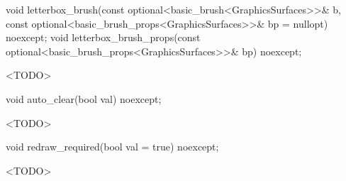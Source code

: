 %
\begin{itemdecl}
void letterbox_brush(const optional<basic_brush<GraphicsSurfaces>>& b,
  const optional<basic_brush_props<GraphicsSurfaces>>& bp = nullopt) noexcept;
void letterbox_brush_props(const optional<basic_brush_props<GraphicsSurfaces>>& bp) noexcept;
\end{itemdecl}
\begin{itemdescr}
\pnum
\effects
<TODO>
\end{itemdescr}

%
\begin{itemdecl}
void auto_clear(bool val) noexcept;
\end{itemdecl}
\begin{itemdescr}
\pnum
\effects
<TODO>
\end{itemdescr}

%
\begin{itemdecl}
void redraw_required(bool val = true) noexcept;
\end{itemdecl}
\begin{itemdescr}
\pnum
\effects
<TODO>
\end{itemdescr}
